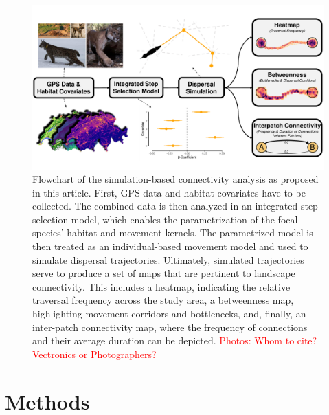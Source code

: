 \documentclass[abstract=on,10pt,a4paper,bibliography=totocnumbered]{article}
\begin{document}
\begin{figure}[htbp]
  \begin{center}
    \includegraphics[width = \textwidth]{99_GraphicalAbstract.pdf}
    \caption{Flowchart of the simulation-based connectivity analysis as proposed
    in this article. First, GPS data and habitat covariates have to be
    collected. The combined data is then analyzed in an integrated step
    selection model, which enables the parametrization of the focal species'
    habitat and movement kernels. The parametrized model is then treated as an
    individual-based movement model and used to simulate dispersal trajectories.
    Ultimately, simulated trajectories serve to produce a set of maps that are
    pertinent to landscape connectivity. This includes a heatmap, indicating the
    relative traversal frequency across the study area, a betweenness map,
    highlighting movement corridors and bottlenecks, and, finally, an
    inter-patch connectivity map, where the frequency of connections and their
    average duration can be depicted. \textcolor{red}{Photos: Whom to cite?
    Vectronics or Photographers?}}
    \label{GraphicalAbstract}
  \end{center}
\end{figure}

\section{Methods}
\end{document}
